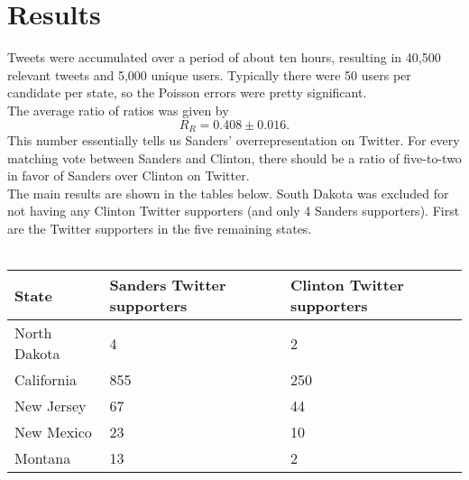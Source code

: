 \documentclass[12pt]{extarticle}
\begin{document}
\section{Results}
Tweets were accumulated over a period of about ten hours, resulting in 40,500 relevant tweets and 5,000 unique users.
Typically there were 50 users per candidate per state, so the Poisson errors were pretty significant.
\\
\indent
The average ratio of ratios was given by
\begin{equation}
R_R = 0.408 \pm 0.016.
\end{equation}
This number essentially tells us Sanders' overrepresentation on Twitter.
For every matching vote between Sanders and Clinton, there should be a ratio of five-to-two in favor of Sanders over Clinton on Twitter.
\\
\indent
The main results are shown in the tables below.
South Dakota was excluded for not having any Clinton Twitter supporters (and only 4 Sanders supporters).
First are the Twitter supporters in the five remaining states.
\\
\\
\begin{centering}
  \begin{tabular}{|l|l|l|}
	  \hline
     State & Sanders Twitter supporters & Clinton Twitter supporters \\
	  \hline
	  \hline
     North Dakota & 4 & 2 \\
     California & 855 & 250 \\
     New Jersey & 67 & 44 \\
     New Mexico & 23 & 10 \\
     Montana & 13 & 2 \\
	  \hline
  \end{tabular}
\end{centering}
\\
\\
\end{document}
